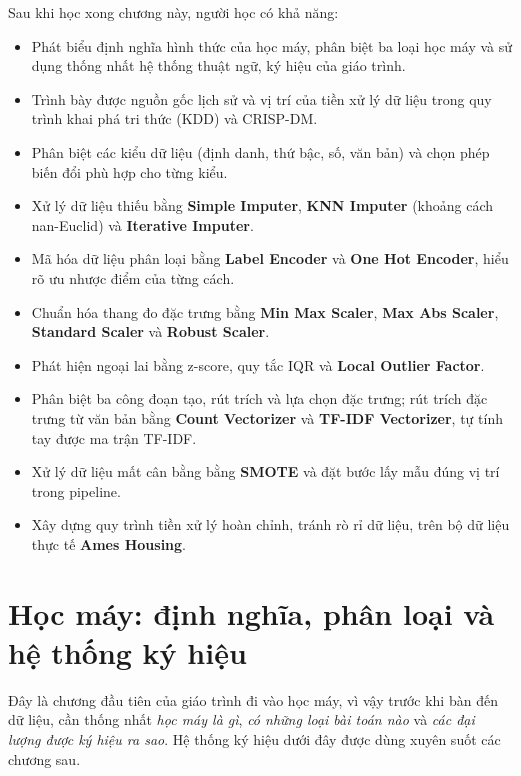 \noindent Sau khi học xong chương này, người học có khả năng:
\begin{itemize}
    \item Phát biểu định nghĩa hình thức của học máy, phân biệt ba loại học máy và sử dụng thống nhất hệ thống thuật ngữ, ký hiệu của giáo trình.
    \item Trình bày được nguồn gốc lịch sử và vị trí của tiền xử lý dữ liệu trong quy trình khai phá tri thức (KDD) và CRISP-DM.
    \item Phân biệt các kiểu dữ liệu (định danh, thứ bậc, số, văn bản) và chọn phép biến đổi phù hợp cho từng kiểu.
    \item Xử lý dữ liệu thiếu bằng \textbf{Simple Imputer}, \textbf{KNN Imputer} (khoảng cách nan-Euclid) và \textbf{Iterative Imputer}.
    \item Mã hóa dữ liệu phân loại bằng \textbf{Label Encoder} và \textbf{One Hot Encoder}, hiểu rõ ưu nhược điểm của từng cách.
    \item Chuẩn hóa thang đo đặc trưng bằng \textbf{Min Max Scaler}, \textbf{Max Abs Scaler}, \textbf{Standard Scaler} và \textbf{Robust Scaler}.
    \item Phát hiện ngoại lai bằng z-score, quy tắc IQR và \textbf{Local Outlier Factor}.
    \item Phân biệt ba công đoạn tạo, rút trích và lựa chọn đặc trưng; rút trích đặc trưng từ văn bản bằng \textbf{Count Vectorizer} và \textbf{TF-IDF Vectorizer}, tự tính tay được ma trận TF-IDF.
    \item Xử lý dữ liệu mất cân bằng bằng \textbf{SMOTE} và đặt bước lấy mẫu đúng vị trí trong pipeline.
    \item Xây dựng quy trình tiền xử lý hoàn chỉnh, tránh rò rỉ dữ liệu, trên bộ dữ liệu thực tế \textbf{Ames Housing}.
\end{itemize}

\section{Học máy: định nghĩa, phân loại và hệ thống ký hiệu}
\label{sec:ml-basics}

Đây là chương đầu tiên của giáo trình đi vào học máy, vì vậy trước khi bàn đến dữ liệu, cần thống nhất \textit{học máy là gì}, \textit{có những loại bài toán nào} và \textit{các đại lượng được ký hiệu ra sao}. Hệ thống ký hiệu dưới đây được dùng xuyên suốt các chương sau.

